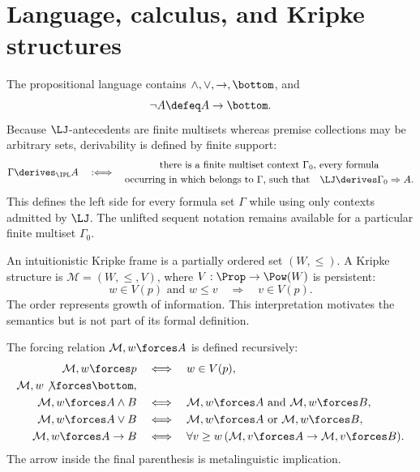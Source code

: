 \section{Language, calculus, and Kripke structures}
\label{sec:intuitionistic-logic-01}

The propositional language contains
\(\land,\lor,\to,\bottom\), and
\[
  \neg A\defeq A\to\bottom.
\]
Because \(\LJ\)-antecedents are finite multisets whereas premise collections
may be arbitrary sets, derivability is defined by finite support:
\[
  \Gamma\derives_{\IPL}A
  \quad:\Longleftrightarrow\quad
  \begin{gathered}
    \text{there is a finite multiset context \(\Gamma_0\), every formula}\\
    \text{occurring in which belongs to \(\Gamma\), such that}
    \quad \LJ\derives\Gamma_0\Rightarrow A.
  \end{gathered}
\]
This defines the left side for every formula set \(\Gamma\) while using only
contexts admitted by \(\LJ\).  The unlifted sequent notation remains available
for a particular finite multiset \(\Gamma_0\).

\begin{definition}
An intuitionistic Kripke frame is a partially ordered set \((W,\leq)\).  A
Kripke structure is \(\mathcal M=(W,\leq,V)\), where
\(V:\Prop\to\Pow(W)\) is persistent:
\[
  w\in V(p)\text{ and }w\leq v
  \quad\Longrightarrow\quad
  v\in V(p).
\]
The order represents growth of information.  This interpretation motivates
the semantics but is not part of its formal definition.
\end{definition}

The forcing relation \(\mathcal M,w\forces A\) is defined recursively:
\[
\begin{aligned}
  \mathcal M,w\forces p
    &\quad\Longleftrightarrow\quad w\in V(p),\\
  \mathcal M,w\not\forces\bottom,
    &\\
  \mathcal M,w\forces A\land B
    &\quad\Longleftrightarrow\quad
      \mathcal M,w\forces A\text{ and }\mathcal M,w\forces B,\\
  \mathcal M,w\forces A\lor B
    &\quad\Longleftrightarrow\quad
      \mathcal M,w\forces A\text{ or }\mathcal M,w\forces B,\\
  \mathcal M,w\forces A\to B
    &\quad\Longleftrightarrow\quad
      \forall v\geq w\,
      (\mathcal M,v\forces A\to\mathcal M,v\forces B).
\end{aligned}
\]
The arrow inside the final parenthesis is metalinguistic implication.

